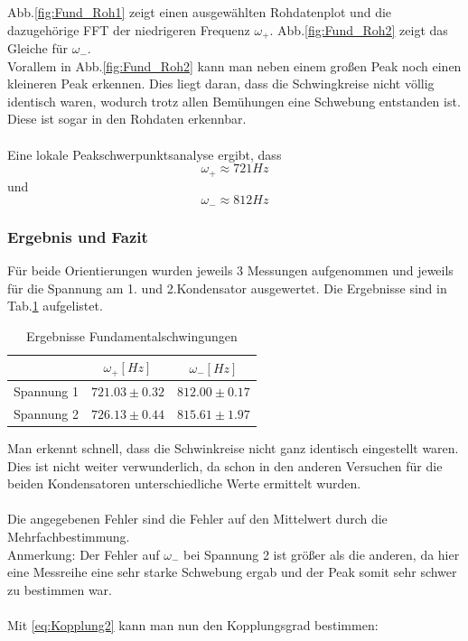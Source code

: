 \documentclass[12pt,a4paper]{article}
\begin{document}
Abb.\ref{fig:Fund_Roh1} zeigt einen ausgewählten Rohdatenplot und die dazugehörige FFT der niedrigeren Frequenz $\omega_+$. Abb.\ref{fig:Fund_Roh2} zeigt das Gleiche für $\omega_-$.\\
Vorallem in Abb.\ref{fig:Fund_Roh2} kann man neben einem großen Peak noch einen kleineren Peak erkennen. Dies liegt daran, dass die Schwingkreise nicht völlig identisch waren, wodurch trotz allen Bemühungen eine Schwebung entstanden ist.
Diese ist sogar in den Rohdaten erkennbar.\\
\\
Eine lokale Peakschwerpunktsanalyse ergibt, dass
\begin{equation}
\omega_+ \approx 721Hz
\end{equation}
und
\begin{equation}
\omega_- \approx 812Hz
\end{equation}

\subsubsection{Ergebnis und Fazit}
Für beide Orientierungen wurden jeweils 3 Messungen aufgenommen und jeweils für die Spannung am 1. und 2.Kondensator ausgewertet. Die Ergebnisse sind in Tab.\ref{tab:Fund_Ergebnis} aufgelistet.

\begin{table}[H]
\begin{center}
\begin{tabular}{|c|c|c|}
\hline 
 & $\omega_+[Hz]$ & $\omega_-[Hz]$ \\ 
\hline 
Spannung 1 & $721.03\pm0.32$ & $812.00\pm0.17$ \\ 
\hline 
Spannung 2 & $726.13\pm0.44$ & $815.61\pm1.97$ \\ 
\hline 
\end{tabular} 
\end{center}
\label{tab:Fund_Ergebnis}
\caption{Ergebnisse Fundamentalschwingungen}
\end{table}

Man erkennt schnell, dass die Schwinkreise nicht ganz identisch eingestellt waren. Dies ist nicht weiter verwunderlich, da schon in den anderen Versuchen für die beiden Kondensatoren unterschiedliche Werte ermittelt wurden.\\
\\
Die angegebenen Fehler sind die Fehler auf den Mittelwert durch die Mehrfachbestimmung.\\
Anmerkung: Der Fehler auf $\omega_-$ bei Spannung 2 ist größer als die anderen, da hier eine Messreihe eine sehr starke Schwebung ergab und der Peak somit sehr schwer zu bestimmen war.\\
\\
Mit \ref{eq:Kopplung2} kann man nun den Kopplungsgrad bestimmen:
\end{document}

